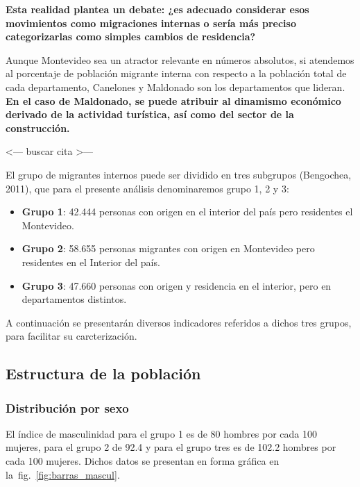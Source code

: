 \documentclass[12pt,spanish,]{article}
\begin{document}
\textbf{Esta realidad plantea un debate: ¿es adecuado considerar esos
movimientos como migraciones internas o sería más preciso categorizarlas
como simples cambios de residencia?}

Aunque Montevideo sea un atractor relevante en números absolutos, si
atendemos al porcentaje de población migrante interna con respecto a la
población total de cada departamento, Canelones y Maldonado son los
departamentos que lideran. \textbf{En el caso de Maldonado, se puede
atribuir al dinamismo económico derivado de la actividad turística, así
como del sector de la construcción.}

\textless{}--- buscar cita \textgreater{}---

El grupo de migrantes internos puede ser dividido en tres subgrupos
(Bengochea, 2011), que para el presente análisis denominaremos grupo 1,
2 y 3:

\begin{itemize}
\item
  \textbf{Grupo 1}: 42.444 personas con origen en el interior del país
  pero residentes el Montevideo.
\item
  \textbf{Grupo 2}: 58.655 personas migrantes con origen en Montevideo
  pero residentes en el Interior del país.
\item
  \textbf{Grupo 3}: 47.660 personas con origen y residencia en el
  interior, pero en departamentos distintos.
\end{itemize}

A continuación se presentarán diversos indicadores referidos a dichos
tres grupos, para facilitar su carcterización.

\hypertarget{estructura-de-la-poblaciuxf3n}{%
\subsection{Estructura de la
población}\label{estructura-de-la-poblaciuxf3n}}

\hypertarget{distribuciuxf3n-por-sexo}{%
\subsubsection{Distribución por sexo}\label{distribuciuxf3n-por-sexo}}

El índice de masculinidad para el grupo 1 es de 80 hombres por cada 100
mujeres, para el grupo 2 de 92.4 y para el grupo tres es de 102.2
hombres por cada 100 mujeres. Dichos datos se presentan en forma gráfica
en la~fig.~\ref{fig:barras_mascul}.
\end{document}
